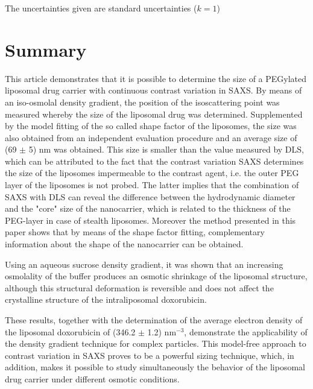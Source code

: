 The uncertainties given are standard uncertainties ($k = 1$)


\section{Summary}
This article demonstrates that it is possible to determine the size of a PEGylated liposomal drug carrier with continuous contrast variation in SAXS. By means of an iso-osmolal density gradient, the position of the isoscattering point was measured whereby the size of the liposomal drug was determined. Supplemented by the model fitting of the so called shape factor of the liposomes, the size was also obtained from an independent evaluation procedure and an average size of (69 $\pm$ 5) nm was obtained. This size is smaller than the value measured by DLS, which can be attributed to the fact that the contrast variation SAXS determines the size of the liposomes impermeable to the contrast agent, i.e. the outer PEG layer of the liposomes is not probed. The latter implies that the combination of SAXS with DLS can reveal the difference between the hydrodynamic diameter and the "core" size of the nanocarrier, which is related to the thickness of the PEG-layer in case of stealth liposomes. Moreover the method presented in this paper shows that by means of the shape factor fitting, complementary information about the shape of the nanocarrier can be obtained.

Using an aqueous sucrose density gradient, it was shown that an increasing osmolality of the buffer produces an osmotic shrinkage of the liposomal structure, although this structural deformation is reversible and does not affect the crystalline structure of the intraliposomal doxorubicin.

These results, together with the determination of the average electron density of the liposomal doxorubicin of (346.2 $\pm$ 1.2) nm$^{-3}$, demonstrate the applicability of the density gradient technique for complex particles. This model-free approach to contrast variation in SAXS proves to be a powerful sizing technique, which, in addition, makes it possible to study simultaneously the behavior of the liposomal drug carrier under different osmotic conditions.

